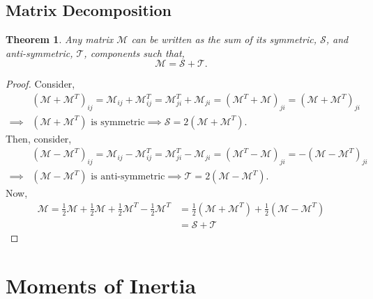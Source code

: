 \documentclass{book}
\newtheorem*{theorem}{Theorem}
\begin{document}
\section{Matrix Decomposition}
\begin{theorem}
    Any matrix $\mathcal{M}$ can be written as the sum of its symmetric, $\mathcal{S}$, and anti-symmetric, $\mathcal{T}$, components such that,
    \begin{equation}
        \mathcal{M} = \mathcal{S} + \mathcal{T}.
    \end{equation}
\end{theorem}
\begin{proof}
    Consider,
    \begin{equation}
        \begin{split}
            &(\mathcal{M} + \mathcal{M}^T)_{ij} = \mathcal{M}_{ij} + \mathcal{M}_{ij}^T = \mathcal{M}_{ji}^T + \mathcal{M}_{ji} = (\mathcal{M}^T + \mathcal{M})_{ji} = (\mathcal{M} + \mathcal{M}^T)_{ji} \\
            \implies&(\mathcal{M} + \mathcal{M}^T)\text{ is symmetric}\implies \mathcal{S} = 2(\mathcal{M} + \mathcal{M}^T).
        \end{split}
    \end{equation}
    Then, consider,
    \begin{equation}
    \begin{split}
            &(\mathcal{M} - \mathcal{M}^T)_{ij} = \mathcal{M}_{ij} - \mathcal{M}_{ij}^T = \mathcal{M}_{ji}^T - \mathcal{M}_{ji} = (\mathcal{M}^T - \mathcal{M})_{ji} = -(\mathcal{M} - \mathcal{M}^T)_{ji} \\
            \implies&(\mathcal{M} - \mathcal{M}^T)\text{ is anti-symmetric}\implies \mathcal{T} = 2(\mathcal{M} - \mathcal{M}^T).
        \end{split}
    \end{equation}
    Now,
    \begin{equation}
        \begin{split}
            \mathcal{M} = \frac{1}{2}\mathcal{M} + \frac{1}{2}\mathcal{M} + \frac{1}{2}\mathcal{M}^T - \frac{1}{2}\mathcal{M}^T & = \frac{1}{2}(\mathcal{M} + \mathcal{M}^T) + \frac{1}{2}(\mathcal{M} -\mathcal{M}^T) \\
            & = \mathcal{S} + \mathcal{T}
        \end{split}
    \end{equation}
\end{proof}
\chapter{Moments of Inertia}
\end{document}
